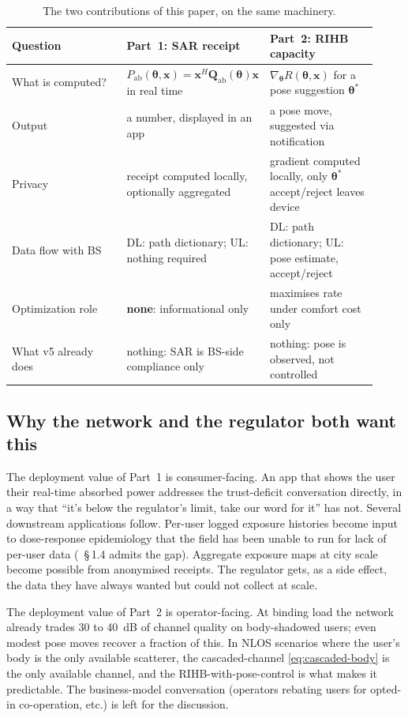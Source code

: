 \documentclass[11pt,a4paper]{article}
\theoremstyle{definition}
\newcommand{\Qabs}{\mathbf{Q}_{\mathrm{ab}}}
\newcommand{\xvec}{\mathbf{x}}
\newcommand{\thetab}{\bm{\theta}}
\newcommand{\Pabs}{P_{\mathrm{ab}}}
\begin{document}
\begin{table}[h]
\caption{The two contributions of this paper, on the same machinery.}
\label{tab:two-parts}
\centering\small
\begin{tabular}{@{}p{0.32\linewidth}p{0.30\linewidth}p{0.30\linewidth}@{}}
\toprule
\textbf{Question} & \textbf{Part~1: SAR receipt} &
\textbf{Part~2: RIHB capacity} \\
\midrule
What is computed? &
$\Pabs(\thetab,\xvec)=\xvec^H\Qabs(\thetab)\xvec$ in real time &
$\nabla_\thetab R(\thetab,\xvec)$ for a pose suggestion $\thetab^*$ \\
Output & a number, displayed in an app & a pose move, suggested via
notification \\
Privacy & receipt computed locally, optionally aggregated &
gradient computed locally, only $\thetab^*$ accept/reject leaves
device \\
Data flow with BS & DL: path dictionary; UL: nothing required &
DL: path dictionary; UL: pose estimate, accept/reject \\
Optimization role & \textbf{none}: informational only &
maximises rate under comfort cost only \\
What v5 already does & nothing: SAR is BS-side compliance only &
nothing: pose is observed, not controlled \\
\bottomrule
\end{tabular}
\end{table}

\subsection{Why the network and the regulator both want this}

The deployment value of Part~1 is consumer-facing.  An app that
shows the user their real-time absorbed power addresses the
trust-deficit conversation directly, in a way that ``it's below
the regulator's limit, take our word for it'' has not.  Several
downstream applications follow.  Per-user logged exposure histories
become input to dose-response epidemiology that the field has
been unable to run for lack of per-user data
(\cite{ICNIRP2020}~\S\,1.4 admits the gap).  Aggregate exposure
maps at city scale become possible from anonymised receipts.  The
regulator gets, as a side effect, the data they have always wanted
but could not collect at scale.

The deployment value of Part~2 is operator-facing.  At binding load
the network already trades \SI{30}{} to \SI{40}{dB} of channel
quality on body-shadowed users; even modest pose moves recover a
fraction of this.  In NLOS scenarios where the user's body is the
only available scatterer, the cascaded-channel
\eqref{eq:cascaded-body} is the only available channel, and the
RIHB-with-pose-control is what makes it predictable.  The
business-model conversation (operators rebating users for opted-in
co-operation, etc.) is left for the discussion.
\end{document}
